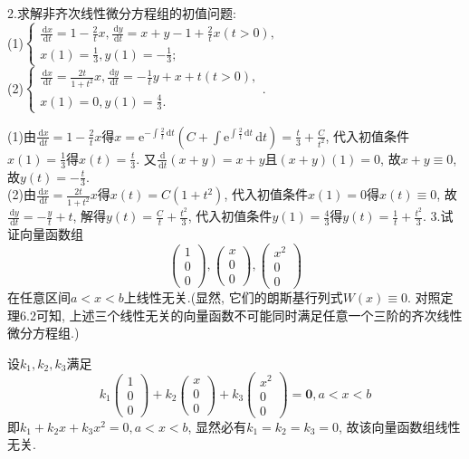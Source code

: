 \documentclass[titlepage,11pt,a4paper,twoside]{report}
\makeatletter
\newcommand\diff{\,\mathrm{d}}
\newcommand\e{\mathrm{e}}
\renewenvironment{proof}{\par
	\pushQED{\qed}%
	\normalfont \topsep1\p@\@plus6\p@\relax
	\trivlist
	\item\relax
	{\hspace*{\parindent}{\heiti 证明}\@addpunct{:}}\hspace\labelsep\ignorespaces
}{%
	\popQED\endtrivlist\@endpefalse
}
\newenvironment{solve}{\par
	\pushQED{\qed}%
	\normalfont \topsep1\p@\@plus6\p@\relax
	\trivlist
	\item\relax
	{\hspace*{\parindent}{\heiti 解}\@addpunct{:}}\hspace\labelsep\ignorespaces
}{%
	\popQED\endtrivlist\@endpefalse
}
\makeatother
\begin{document}
2.求解非齐次线性微分方程组的初值问题:\\
(1)$\displaystyle\begin{cases}\frac{\diff x}{\diff t}=1-\frac{2}{t}x,\frac{\diff y}{\diff t}=x+y-1+\frac{2}{t}x(t>0),\\x(1)=\frac{1}{3},y(1)=-\frac{1}{3};\end{cases}$\\
(2)$\begin{cases}
\frac{\diff x}{\diff t}=\frac{2t}{1+t^2}x,\frac{\diff y}{\diff t}=-\frac{1}{t}y+x+t(t>0),\\
x(1)=0,y(1)=\frac{4}{3}.
\end{cases}$.
\begin{solve}
(1)由$\frac{\diff x}{\diff t}=1-\frac{2}{t}x$得$x=\e^{-\int\frac{2}{t}\diff t}\left(C+\int\e^{\int\frac{2}{t}\diff t}\diff t\right)=\frac{t}{3}+\frac{C}{t^2}$, 代入初值条件$x(1)=\frac{1}{3}$得$x(t)=\frac{t}{3}$. 又$\frac{\diff}{\diff t}(x+y)=x+y$且$(x+y)(1)=0$, 故$x+y\equiv0$, 故$y(t)=-\frac{t}{3}$.\\
(2)由$\frac{\diff x}{\diff t}=\frac{2t}{1+t^2}x$得$x(t)=C(1+t^2)$, 代入初值条件$x(1)=0$得$x(t)\equiv0$, 故$\frac{\diff y}{\diff t}=-\frac{y}{t}+t$, 解得$y(t)=\frac{C}{t}+\frac{t^2}{3}$, 代入初值条件$y(1)=\frac{4}{3}$得$y(t)=\frac{1}{t}+\frac{t^2}{3}$.
\end{solve}
3.试证向量函数组
\[\begin{pmatrix}1\\0\\0\end{pmatrix},\begin{pmatrix}x\\0\\0\end{pmatrix},\begin{pmatrix}x^2\\0\\0\end{pmatrix}\]
在任意区间$a<x<b$上线性无关.(显然, 它们的朗斯基行列式$W(x)\equiv0$. 对照定理6.2可知, 上述三个线性无关的向量函数不可能同时满足任意一个三阶的齐次线性微分方程组.)
\begin{proof}
设$k_1,k_2,k_3$满足
\[k_1\begin{pmatrix}1\\0\\0\end{pmatrix}+k_2\begin{pmatrix}x\\0\\0\end{pmatrix}+k_3\begin{pmatrix}x^2\\0\\0\end{pmatrix}=\bm{0},a<x<b\]
即$k_1+k_2x+k_3x^2=0,a<x<b$, 显然必有$k_1=k_2=k_3=0$, 故该向量函数组线性无关.
\end{proof}
\end{document}
